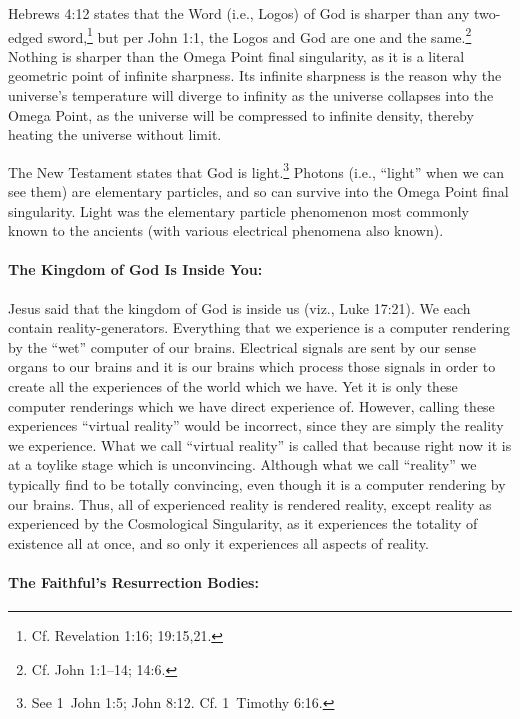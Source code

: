 \documentclass[letterpaper,12pt]{article}
\begin{document}
Hebrews 4:12 states that the Word (i.e., Logos) of God is sharper than any two-edged sword,\footnote{Cf. Revelation 1:16; 19:15,21.} but per John 1:1, the Logos and God are one and the same.\footnote{Cf. John 1:1--14; 14:6.} Nothing is sharper than the Omega Point final singularity, as it is a literal geometric point of infinite sharpness. Its infinite sharpness is the reason why the universe's temperature will diverge to infinity as the universe collapses into the Omega Point, as the universe will be compressed to infinite density, thereby heating the universe without limit.

The New Testament states that God is light.\footnote{See 1~John 1:5; John 8:12. Cf. 1~Timothy 6:16.} Photons (i.e., ``light'' when we can see them) are elementary particles, and so can survive into the Omega Point final singularity. Light was the elementary particle phenomenon most commonly known to the ancients (with various electrical phenomena also known).

\paragraph{The Kingdom of God Is Inside You:}
\label{parag:KingdomOfGodIsInsideYou}

Jesus said that the kingdom of God is inside us (viz., Luke 17:21). We each contain reality-generators. Everything that we experience is a computer rendering by the ``wet'' computer of our brains. Electrical signals are sent by our sense organs to our brains and it is our brains which process those signals in order to create all the experiences of the world which we have. Yet it is only these computer renderings which we have direct experience of. However, calling these experiences ``virtual reality'' would be incorrect, since they are simply the reality we experience. What we call ``virtual reality'' is called that because right now it is at a toylike stage which is unconvincing. Although what we call ``reality'' we typically find to be totally convincing, even though it is a computer rendering by our brains. Thus, all of experienced reality is rendered reality, except reality as experienced by the Cosmological Singularity, as it experiences the totality of existence all at once, and so only it experiences all aspects of reality.

\paragraph{The Faithful's Resurrection Bodies:}
\label{parag:FaithfulsResurrectionBodies}
\end{document}
